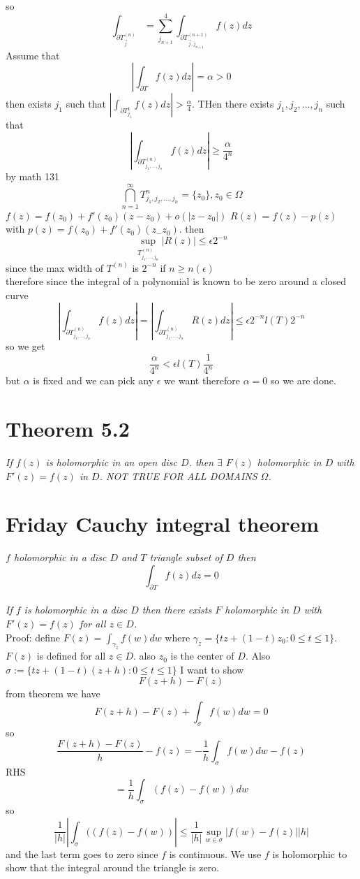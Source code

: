 \documentclass[11pt]{article}
\begin{document}
so
\[
    \int_{\partial T_{\vec j}^{(n)}}^{} = \sum_{j_{n+1}}^{4}\int_{\partial T_{\vec j,j_{n+1}}^{(n+1)}}^{}f(z)dz
\] 
Assume that
\[
\left|\int_{\partial T}^{}f(z)dz\right| = \alpha > 0
\] 
then exists $j_1$ such that $\left | \int_{\partial T_{j_1}^{1}}^{}f(z)dz \right| > \frac{\alpha}{4}$.
THen there exists $j_1,j_2,\dots,j_n$ such that
\[
    \left | \int_{\partial T_{j_1,\dots,j_n}^{(n)}}^{}f(z)dz \right| \ge \frac{\alpha}{4^{n}}
\] 
by math 131
 \[
     \bigcap_{n=1}^{\infty}T_{j_1,j_2,\dots,j_n}^{n} =\{z_0\}, z_0 \in \Omega
\] 
$f(z) = f(z_0) + f'(z_0)(z-z_0) + o(|z-z_0|)$ $R(z) = f(z) - p(z)$ with  $p(z) = f(z_0) + f'(z_0)(z_-z_0)$. then
\[
    \sup_{T^{(n)}_{j_1,\dots,j_n}}|R(z)| \le \epsilon 2^{-n}
\] 
since the max width of $T^{(n)}$ is $2^{-n}$
if $n \ge n(\epsilon)$\\
therefore  since the integral of a polynomial is known to be zero around a closed curve
\[
    \left |\int_{\partial T_{j_1,\dots,j_n}^{(n)}}^{}f(z)dz \right| = \left | \int_{\partial T_{j_1,\dots,j_n}^{(n)}}^{} R(z)dz\right | \le \epsilon 2^{-n}l(T)2^{-n}
\] 
so we get
\[
\frac{\alpha}{4^{n}} < \epsilon l(T) \frac{1}{4^{n}}
\] 
but $\alpha$ is fixed and we can pick any $\epsilon$ we want therefore
$\alpha = 0$ so we are done.

\section{Theorem 5.2}
\emph{
    If $f(z)$ is holomorphic in an open disc  $D$. 
    then  $\exists$  $F(z)$ holomorphic in  $D$ with  $F'(z) = f(z)$ in  $D$. NOT TRUE FOR ALL DOMAINS  $\Omega$.
}

\section{Friday Cauchy integral theorem}
\emph{
   $f$ holomorphic in a disc $ D$ and $T$ triangle subset of  $D$ then
    \[
   \int_{\partial T}^{}f(z)dz = 0
   \] 
}\emph{\\
   If $f$ is holomorphic in a disc $D$ then there exists $F$ holomorphic in $D$ with  $F'(z) = f(z)$ for all  $z \in D$.
}\\
Proof: define $F(z) = \int_{ \gamma_z}^{}f(w)dw$ where $\gamma_z = \{tz + (1-t)z_0: 0 \le t \le 1\}$. $F(z)$ is defined for all  $z \in D$. also  $z_0$ is the center of $D$.
Also $\sigma := \{tz + (1-t)(z+h): 0 \le t \le 1\}$ I want to show
\[
F(z+h) - F(z)
\] 
from theorem we have
\[
F(z+h) - F(z) + \int_{\sigma}^{}f(w)dw = 0
\] 
so
\[
    \frac{F(z+h) - F(z)}{h} - f(z) = -\frac{1}{h}\int_{\sigma}^{}f(w)dw - f(z)
\] 
RHS
\[
=\frac{1}{h}\int_{\sigma}^{}(f(z)-f(w))dw
\] 
so
\[
    \frac{1}{|h|}|\int_{\sigma}^{}((f(z)-f(w))| \le \frac{1}{|h|}\sup_{w \in \sigma}|f(w)-f(z)| |h|
\] 
and the last term goes to zero since $f$ is continuous. We use $f$ is holomorphic to show that the integral around the triangle is zero.
\end{document}
